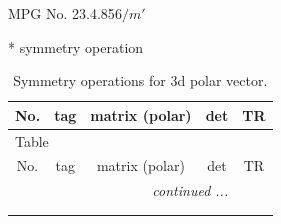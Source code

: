\documentclass[fleqn,8pt]{jsarticle}
\begin{document}
\setcounter{MaxMatrixCols}{32}

\renewcommand{\tablename}{Table~}
\renewcommand{\figurename}{Figure~}
\begin{center}
\LARGE
MPG No. 23.4.85\quad$6/m'$
\end{center}
* symmetry operation
\renewcommand{\arraystretch}{1.3}
\begin{longtable}{ccccc}
\caption{Symmetry operations for 3d polar vector.}
 \\
 \hline \hline
No. & tag & matrix (polar) & det & TR \\ \hline \endfirsthead

\multicolumn{4}{l}{\tablename\ \thetable{}} \\
 \hline \hline
No. & tag & matrix (polar) & det & TR \\ \hline \endhead

 \hline \hline
\multicolumn{4}{r}{\footnotesize\it continued ...} \\ \endfoot

 \hline \hline
\multicolumn{4}{r}{} \\ \endlastfoot


\end{longtable}
\end{document}
